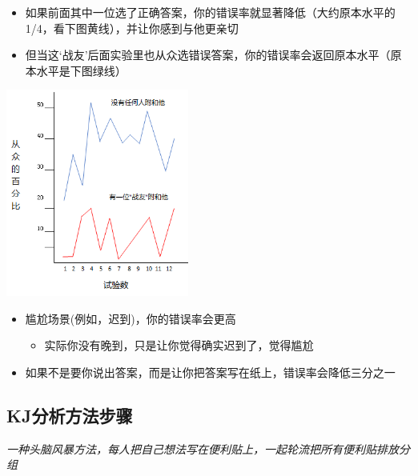 \begin{itemize}
\tightlist
\item
  如果前面其中一位选了正确答案，你的错误率就显著降低（大约原本水平的1/4，看下图黄线），并让你感到与他更亲切
\item
  但当这`战友'后面实验里也从众选错误答案，你的错误率会返回原本水平（原本水平是下图绿线）
\end{itemize}



\includegraphics[width=6cm]{Asch4Screenshot_2022-07-08_2015021.png}

\begin{itemize}
\tightlist
\item
  尴尬场景(例如，迟到)，你的错误率会更高

  \begin{itemize}
  \tightlist
  \item
    实际你没有晚到，只是让你觉得确实迟到了，觉得尴尬
  \end{itemize}
\item
  如果不是要你说出答案，而是让你把答案写在纸上，错误率会降低三分之一
\end{itemize}

\hypertarget{kjux6b65ux9aa4}{%
\subsection{KJ分析方法步骤}\label{kjux6b65ux9aa4}}

\emph{一种头脑风暴方法，每人把自己想法写在便利贴上，一起轮流把所有便利贴排放分组}

